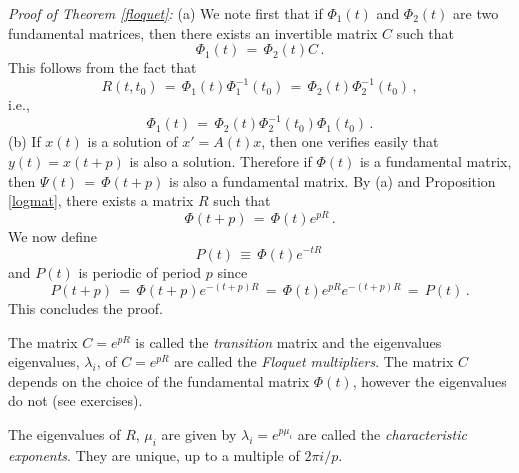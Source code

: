 \documentclass[12pt]{report}
\def\qed{\hbox{\hskip 6pt\vrule width6pt height7pt depth1pt
    \hskip1pt}\bigskip}
\begin{document}
 \noindent 
{\em Proof of Theorem \ref{floquet}:} (a) We note first that if
$\Phi_1(t)$ and $\Phi_2(t)$ are two fundamental matrices, then there exists 
an invertible matrix $C$
such that
\begin{equation} \Phi_1(t) \,=\, \Phi_2(t) C \,.
\end{equation}
This follows from the fact that 
\begin{equation}
R(t,t_0) \,=\, \Phi_1(t) \Phi^{-1}_1(t_0) \,=\, \Phi_2(t)  \Phi^{-1}_2(t_0) \,,
\end{equation}
i.e., 
\begin{equation}
\Phi_1(t) \,=\, \Phi_2(t)  \Phi^{-1}_2(t_0) \Phi_1(t_0) \,.
\end{equation}
(b) If $x(t)$ is a solution of $x'=A(t)x$, then one verifies easily
that $y(t)=x(t+p)$ is also a solution.  Therefore if $\Phi(t)$ is a
fundamental matrix, then $\Psi(t) \,=\, \Phi(t+p)$ is also a
fundamental matrix. By (a) and Proposition \ref{logmat}, there exists a
matrix $R$ such that
\begin{equation}
\Phi(t+p) \,=\, \Phi(t) e^{pR} \,.
\end{equation}
We now define 
\begin{equation}
P(t) \,\equiv\, \Phi(t) e^{-tR} \, 
\end{equation}
and $P(t)$ is periodic of period $p$ since
\begin{equation}
P(t+p) \,=\, \Phi(t+p) e^{-(t+p)R} \,=\, \Phi(t) e^{pR} e^{-(t+p)R} \,=\, 
P(t) \,.
\end{equation}
This concludes the proof. \hfill \qed


The matrix $C=e^{pR}$ is called the {\em transition} matrix and the eigenvalues 
eigenvalues, $\lambda_i$, of $C=e^{pR}$ are called the {\em Floquet multipliers}. 
The matrix $C$ depends on the choice of the fundamental matrix $\Phi(t)$, however  
the eigenvalues do not (see exercises).  

The eigenvalues of $R$, $\mu_i$ are given by $\lambda_i=e^{p\mu_i}$ are called the 
{\em characteristic exponents}. They are unique, up to a multiple of $2\pi i/p$. 
\end{document}

